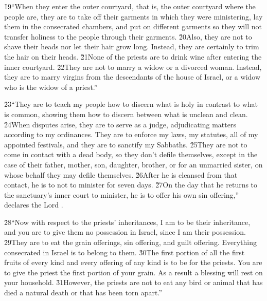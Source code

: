 \v{19}``When they enter the outer courtyard, that is, the outer courtyard where the people are, they are to take off their garments in which they were ministering, lay them in the consecrated chambers, and put on different garments so they will not transfer holiness to the people through their garments. \v{20}Also, they are not to shave their heads nor let their hair grow long. Instead, they are certainly to trim the hair on their heads. \v{21}None of the priests are to drink wine after entering the inner courtyard. \v{22}They are not to marry a widow or a divorced woman. Instead, they are to marry virgins from the descendants of the house of Israel, or a widow who is the widow of a priest.''

\v{23}``They are to teach my people how to discern what is holy in contrast to what is common, showing them how to discern between what is unclean and clean. \v{24}When disputes arise, they are to serve as a judge, adjudicating matters according to my ordinances. They are to enforce my laws, my statutes, all of my appointed festivals, and they are to sanctify my Sabbaths. \v{25}They are not to come in contact with a dead body, so they don't defile themselves, except in the case of their father, mother, son, daughter, brother, or for an unmarried sister, on whose behalf they may defile themselves. \v{26}After he is cleansed from that contact, he is to not to minister for seven days. \v{27}On the day that he returns to the sanctuary's inner court to minister, he is to offer his own sin offering,'' declares the Lord .

\v{28}``Now with respect to the priests' inheritances, I am to be their inheritance, and you are to give them no possession in Israel, since I am their possession. \v{29}They are to eat the grain offerings, sin offering, and guilt offering. Everything consecrated in Israel is to belong to them. \v{30}The first portion of all the first fruits of every kind and every offering of any kind is to be for the priests. You are to give the priest the first portion of your grain. As a result a blessing will rest on your household. \v{31}However, the priests are not to eat any bird or animal that has died a natural death or that has been torn apart.''


